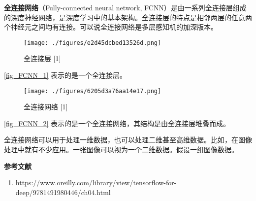 
\dr


\textbf{全连接网络}（Fully-connected neural network, FCNN）是由一系列全连接层组成的深度神经网络，是深度学习中的基本架构。全连接层的特点是相邻两层的任意两个神经元之间均有连接。可以说全连接网络是多层感知机的加深版本。

\begin{figure}[ht]
\centering
\texttt{[image: ./figures/e2d45dcbed13526d.png]}
\caption{全连接层 [1]} \label{fig_FCNN_1}
\end{figure}
\autoref{fig_FCNN_1} 表示的是一个全连接层。

\begin{figure}[ht]
\centering
\texttt{[image: ./figures/6205d3a76aa14e17.png]}
\caption{全连接网络 [1]} \label{fig_FCNN_2}
\end{figure}
\autoref{fig_FCNN_2} 表示的是一个全连接网络，其结构是由全连接层堆叠而成。

全连接网络可以用于处理一维数据，也可以处理二维甚至高维数据。比如，在图像处理中就有不少应用。一张图像可以视为一个二维数据。假设一组图像数据。



\textbf{参考文献}
\begin{enumerate}
\item https://www.oreilly.com/library/view/tensorflow-for-deep/9781491980446/ch04.html
\end{enumerate}